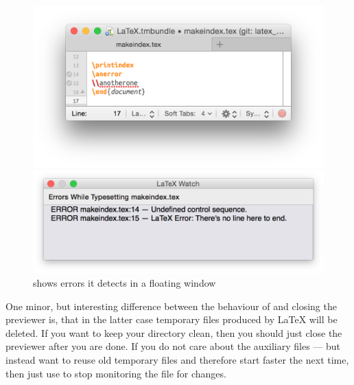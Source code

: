 \documentclass[11pt, x11names]{article}
\begin{document}
\begin{figure}[htbp]
    \begin{minipage}[t]{0.5\textwidth}
      \vspace{0cm}
      \centering
        \includegraphics[width=\textwidth]{Figures/LaTeX Watch - TextMate.png}
    \end{minipage}
    \begin{minipage}[t]{0.5\textwidth}
      \vspace{0.5cm}
      \centering
        \includegraphics[width=\textwidth]{Figures/LaTeX Watch - Notification Window.png}
    \end{minipage}

    \caption{ shows errors it detects in a floating window}
    \label{fig:LaTeX_Watch}
\end{figure}

One minor, but interesting difference between the behaviour of  and closing the previewer is, that in the latter case temporary files produced by LaTeX will be deleted. If you want to keep your directory clean, then you should just close the previewer after you are done. If you do not care about the auxiliary files — but instead want  to reuse old temporary files and therefore start faster the next time, then just use  to stop monitoring the file for changes.
\end{document}
